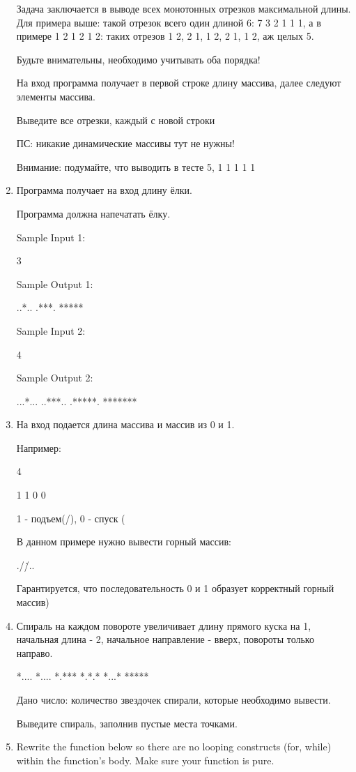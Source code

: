 \documentclass[]{article}
\begin{document}
\begin{enumerate}
Задача заключается в выводе всех монотонных отрезков максимальной длины. Для примера выше: такой отрезок всего один длиной 6: 7 3 2 1 1 1, а в примере 1 2 1 2 1 2: таких отрезов 1 2, 2 1, 1 2,  2 1, 1 2, аж целых 5.

Будьте внимательны, необходимо учитывать оба порядка!

На вход программа получает в первой строке длину массива, далее следуют элементы массива.

Выведите все отрезки, каждый с новой строки

ПС: никакие динамические массивы тут не нужны!

Внимание: подумайте, что выводить в тесте 5, 1 1 1 1 1


\item
Программа получает на вход длину ёлки.

Программа должна напечатать ёлку.

Sample Input 1:

3

Sample Output 1:

..*..
.***.
*****

Sample Input 2:

4

Sample Output 2:

...*...
..***..
.*****.
*******


\item
На вход подается длина массива и массив из 0 и 1.

Например:

4

1 1 0 0

1 - подъем(/), 0 - спуск (\)

В данном примере нужно вывести горный массив:

./\.

/..\

Гарантируется, что последовательность 0 и 1 образует корректный горный массив)

\item
Спираль на каждом повороте увеличивает длину прямого куска на 1, начальная длина - 2, начальное направление - вверх, повороты только направо.

*....
*....
*.***
*.*.*
*...*
*****

Дано число: количество звездочек спирали, которые необходимо вывести.

Выведите спираль, заполнив пустые места точками.

\item
Rewrite the function below so there are no looping constructs (for, while) within the function's body. Make sure your function is pure.


\end{enumerate}
\end{document}
